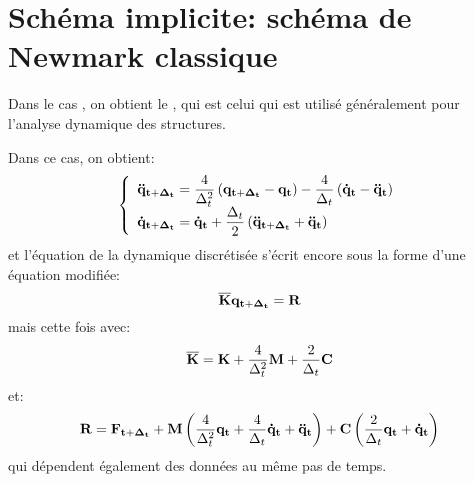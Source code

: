 \bigskip
\section{Schéma implicite: schéma de Newmark classique}

Dans le cas , on obtient le , 
qui est celui qui est utilisé généralement pour l'analyse dynamique des structures.

Dans ce cas, on obtient:
\begin{equation}\colorgreen
\left\{
\begin{array}{l}\displaystyle
\VV{\ddot q_{t+\Delta_t}} = \frac4{\Delta_t^2} \left( \VV{q_{t+\Delta_t}} -\VV{q_t}\right) 
-\frac4{\Delta_t}\left( \VV{\dot q_t} - \VV{\ddot q_t}\right)\\[+2mm] 
\displaystyle
\VV{\dot q_{t+\Delta_t}} = \VV{\dot q_t} + \frac{\Delta_t}2\left( \VV{\ddot q_{t+\Delta_t}} + \VV{\ddot q_t}\right)
\end{array}
\right.
\end{equation}
et l'équation de la dynamique discrétisée s'écrit encore sous la forme d'une équation modifiée:
\begin{equation}\colorblue
\MM{\overline{K}} \VV{q_{t+\Delta_t}} = \VV{R}
\end{equation}
mais cette fois avec:
\begin{equation}\colorgreen
\MM{\overline{K}} = \MM{K}+\frac4{\Delta_t^2}\MM{M}+\frac2{\Delta_t}\MM{C}
\end{equation}
et:
\begin{equation}\colorgreen
\VV{R} = \VV{F_{t+\Delta_t}} + \MM{M}\left(\frac4{\Delta_t^2}\VV{q_t} + \frac4{\Delta_t}\VV{\dot q_t} 
+ \VV{\ddot q_t}\right)
+\MM{C}\left( \frac2{\Delta_t}\VV{q_t} + \VV{\dot q_t}\right)
\end{equation}
qui dépendent également des données au même pas de temps.

